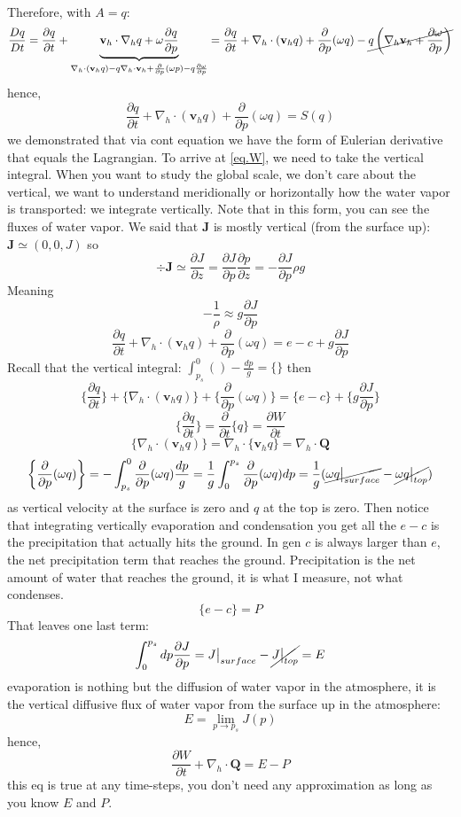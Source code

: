 Therefore, with $A=q$:
\[\frac{Dq}{Dt}=\frac{\partial q}{\partial t}+\underbrace{\mathbf{v}_h\cdot\nabla_hq+\omega\frac{\partial q}{\partial p}}_{\nabla_h\cdot(\mathbf{v}_hq)-q\nabla_h\cdot\mathbf{v}_h+\frac{\partial}{\partial p}(\omega p)-q\frac{\partial\omega}{\partial p}}=\frac{\partial q}{\partial t}+\nabla_h\cdot (\mathbf{v}_hq)+\frac{\partial}{\partial p}(\omega q)-\cancel{q\left(\nabla_h\mathbf{v}_h+\frac{\partial\omega}{\partial p}\right)}\]
hence, 
\[\frac{\partial q}{\partial t}+\nabla_h\cdot (\mathbf{v}_hq)+\frac{\partial}{\partial p}(\omega q)=S(q)\]
we demonstrated that via cont equation we have the form of Eulerian derivative that equals the Lagrangian. To arrive at \eqref{eq.W}, we need to take the vertical integral. When you want to study the global scale, we don't care about the vertical, we want to understand meridionally or horizontally how the water vapor is transported: we integrate vertically. Note that in this form, you can see the fluxes of water vapor. 
We said that $\mathbf{J}$ is mostly vertical (from the surface up): $\mathbf{J}\simeq(0,0,J)$ so \[\div{\mathbf{J}}\simeq\frac{\partial J}{\partial z}=\frac{\partial J}{\partial p}\frac{\partial p}{\partial z}=-\frac{\partial J}{\partial p}\rho g\] 
Meaning 
$$-\frac{1}{\rho}\approx g\frac{\partial J}{\partial p}$$
\[\frac{\partial q}{\partial t}+\nabla_h\cdot (\mathbf{v}_hq)+\frac{\partial}{\partial p}(\omega q)=e-c+g\frac{\partial J}{\partial p}\]
Recall that the vertical integral: $\int_{p_s}^0()-\frac{dp}{g}=\{\}$
then
\[\{\frac{\partial q}{\partial t}\}+\{\nabla_h\cdot (\mathbf{v}_hq)\}+\{\frac{\partial}{\partial p}(\omega q)\}=\{e-c\}+\{g\frac{\partial J}{\partial p}\}\]
$$\{\frac{\partial q}{\partial t}\}=\frac{\partial }{\partial t}\{q\}=\frac{\partial W}{\partial t}$$
$$\{\nabla_h\cdot (\mathbf{v}_hq)\}=\nabla_h\cdot\{\mathbf{v}_hq\}=\nabla_h\cdot\mathbf{Q}$$
$$\left\{\frac{\partial}{\partial p}(\omega q)\right\}=-\int_{p_s}^0\frac{\partial}{\partial p}(\omega q)\frac{dp}{g}=\frac{1}{g}\int_0^{p_s}\frac{\partial}{\partial p}(\omega q)dp=\frac{1}{g}(\cancel{\omega q\big|_{surface}}-\cancel{\omega q\big|_{top}})$$
as vertical velocity at the surface is zero and $q$ at the top is zero. Then notice that integrating vertically evaporation and condensation you get all the $e-c$ is the precipitation that actually hits the ground. In gen $c$ is always larger than $e$, the net precipitation term that reaches the ground. Precipitation is the net amount of water that reaches the ground, it is what I measure, not what condenses. 
$$\{e-c\}=P$$
That leaves one last term: 
$$\int_0^{p_s}dp\frac{\partial J}{\partial p}=J\big|_{surface}-\cancel{J\big|_{top}}=E$$
evaporation is nothing but the diffusion of water vapor in the atmosphere, it is the vertical diffusive flux of water vapor from the surface up in the atmosphere:
$$E=\lim_{p\to p_s}J(p)$$
hence, 
\[\frac{\partial W}{\partial t}+\nabla_h\cdot\mathbf{Q}=E-P\]
this eq is true at any time-steps, you don't need any approximation as long as you know $E$ and $P$. 

